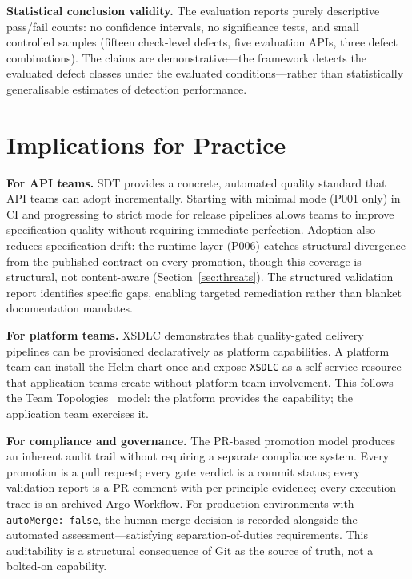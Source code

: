 \textbf{Statistical conclusion validity.} The evaluation reports purely descriptive pass/fail counts: no confidence intervals, no significance tests, and small controlled samples (fifteen check-level defects, five evaluation APIs, three defect combinations). The claims are demonstrative---the framework detects the evaluated defect classes under the evaluated conditions---rather than statistically generalisable estimates of detection performance.

\section{Implications for Practice}
\label{sec:implications}

\textbf{For API teams.} SDT provides a concrete, automated quality standard that API teams can adopt incrementally. Starting with minimal mode (P001 only) in CI and progressing to strict mode for release pipelines allows teams to improve specification quality without requiring immediate perfection. Adoption also reduces specification drift: the runtime layer (P006) catches structural divergence from the published contract on every promotion, though this coverage is structural, not content-aware (Section~\ref{sec:threats}). The structured validation report identifies specific gaps, enabling targeted remediation rather than blanket documentation mandates.

\textbf{For platform teams.} XSDLC demonstrates that quality-gated delivery pipelines can be provisioned declaratively as platform capabilities. A platform team can install the Helm chart once and expose \texttt{XSDLC} as a self-service resource that application teams create without platform team involvement. This follows the Team Topologies~\cite{team-topologies} model: the platform provides the capability; the application team exercises it.

\textbf{For compliance and governance.} The PR-based promotion model produces an inherent audit trail without requiring a separate compliance system. Every promotion is a pull request; every gate verdict is a commit status; every validation report is a PR comment with per-principle evidence; every execution trace is an archived Argo Workflow. For production environments with \texttt{autoMerge: false}, the human merge decision is recorded alongside the automated assessment---satisfying separation-of-duties requirements. This auditability is a structural consequence of Git as the source of truth, not a bolted-on capability.

